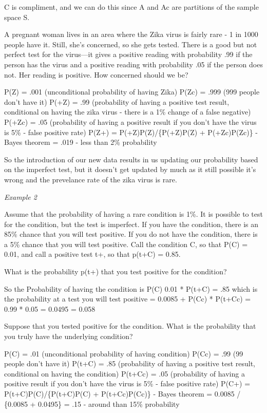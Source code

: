 \documentclass[]{book}
\theoremstyle{definition}
\theoremstyle{definition}
\theoremstyle{definition}
\theoremstyle{remark}
\begin{document}
C is compliment, and we can do this since A and Ac are partitions of the
sample space S.

A pregnant woman lives in an area where the Zika virus is fairly rare -
1 in 1000 people have it. Still, she's concerned, so she gets tested.
There is a good but not perfect test for the virus---it gives a positive
reading with probability .99 if the person has the virus and a positive
reading with probability .05 if the person does not. Her reading is
positive. How concerned should we be?

P(Z) = .001 (unconditional probability of having Zika) P(Zc) = .999 (999
people don't have it) P(+\textbar{}Z) = .99 (probability of having a
positive test result, conditional on having the zika virus - there is a
1\% change of a false negative) P(+\textbar{}Zc) = .05 (probability of
having a positive result if you don't have the virus is 5\% - false
positive rate) P(Z\textbar{}+) =
P(+\textbar{}Z)P(Z)/\{P(+\textbar{}Z)P(Z) + P(+\textbar{}Zc)P(Zc)\} -
Bayes theorem = .019 - less than 2\% probability

So the introduction of our new data results in us updating our
probability based on the imperfect test, but it doesn't get updated by
much as it still possible it's wrong and the prevelance rate of the zika
virus is rare.

\emph{Example 2}

Assume that the probability of having a rare condition is 1\%. It is
possible to test for the condition, but the test is imperfect. If you
have the condition, there is an 85\% chance that you will test positive.
If you do not have the condition, there is a 5\% chance that you will
test positive. Call the condition C, so that P(C) = 0.01, and call a
positive test t+, so that p(t+\textbar{}C) = 0.85.

What is the probability p(t+) that you test positive for the condition?

So the Probability of having the condition is P(C) 0.01 *
P(t+\textbar{}C) = .85 which is the probability at a test you will test
positive = 0.0085 + P(Cc) * P(t+\textbar{}Cc) = 0.99 * 0.05 = 0.0495 =
0.058

Suppose that you tested positive for the condition. What is the
probability that you truly have the underlying condition?

P(C) = .01 (unconditional probability of having condition) P(Cc) = .99
(99 people don't have it) P(t+\textbar{}C) = .85 (probability of having
a positive test result, conditional on having the condition)
P(t+\textbar{}Cc) = .05 (probability of having a positive result if you
don't have the virus is 5\% - false positive rate) P(C\textbar{}+) =
P(t+\textbar{}C)P(C)/\{P(t+\textbar{}C)P(C) + P(t+\textbar{}Cc)P(Cc)\} -
Bayes theorem = 0.0085 / \{0.0085 + 0.0495\} = .15 - around than 15\%
probability
\end{document}
